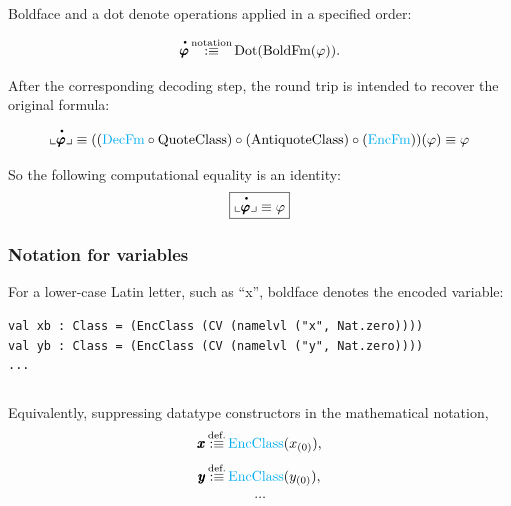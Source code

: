 \begin{note}
Boldface and a dot denote operations applied in a specified order:

\[
\meta{\pmb{\phi}} \equivnot \text{Dot}(\text{BoldFm}(\phi)).
\]

After the corresponding decoding step, the round trip is intended to recover the original formula:

\[
\llcorner
\meta{\pmb{\phi}} 
\lrcorner
\equiv 
(
(\DecFm \circ \Quote\Class)
\circ
(\text{AntiquoteClass})%
\circ
(\EncFm)
)(\phi)
\equiv
\phi
\]%

So the following computational equality is an identity:
\[
\boxed{
\llcorner
\meta{\pmb{\phi}} 
\lrcorner
\equiv 
\phi
}
\]
\end{note}

\subsubsection{Notation for variables}
\begin{notation}
For a lower-case Latin letter, such as ``x'', boldface denotes the encoded variable:
\iftrue
\begin{lstlisting}
val xb : Class = (EncClass (CV (namelvl ("x", Nat.zero))))
val yb : Class = (EncClass (CV (namelvl ("y", Nat.zero))))
...
\end{lstlisting}
\fi
\begin{lstlisting}
\end{lstlisting}
Equivalently, suppressing datatype constructors in the mathematical notation,
\[
\pmb{x} \,{\stackrel{{\textrm{def.}}}{:\equiv}}\, {\text{\textcolor{cyan}{EncClass}}}(x_{(0)} ),
\]
\[
\pmb{y} \,{\stackrel{{\textrm{def.}}}{:\equiv}}\, {\text{\textcolor{cyan}{EncClass}}}( y_{(0)} ),
\]
\[
\dots
\]
\end{notation}%

